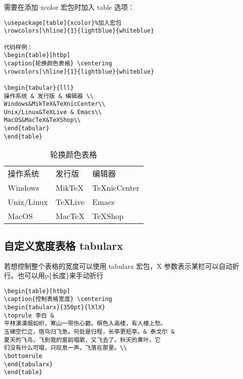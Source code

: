 需要在添加 xcolor 宏包时加入 table 选项：
\begin{Verbatim}[formatcom=\color{grass},frame=single]
\usepackage[table]{xcolor}%加入宏包
\rowcolors[\hline]{1}{lightblue}{whiteblue}

代码样例：
\begin{table}[htbp]
\caption{轮换颜色表格} \centering
\rowcolors[\hline]{1}{lightblue}{whiteblue}

\begin{tabular}{lll}
操作系统 & 发行版 & 编辑器 \\
Windows&MikTeX&TeXnicCenter\\
Unix/Linux&TeXLive & Emacs\\
MacOS&MacTeX&TeXShop\\
\end{tabular}
\end{table}
\end{Verbatim}


\begin{table}[htbp]
\caption{轮换颜色表格} \centering
{}
\begin{tabular}{lll}
操作系统 & 发行版 & 编辑器 \\
Windows&MikTeX&TeXnicCenter\\
Unix/Linux&TeXLive & Emacs\\
MacOS&MacTeX&TeXShop\\
\end{tabular}
\end{table}




\subsection{自定义宽度表格 tabularx }


若想控制整个表格的宽度可以使用 tabularx 宏包，X
参数表示某栏可以自动折行。也可以用p\{长度\}来手动折行\\
\begin{Verbatim}
\begin{table}[htbp]
\caption{控制表格宽度} \centering
\begin{tabularx}{350pt}{lXlX}
\toprule 李白 &
平林漠漠烟如织，寒山一带伤心碧。暝色入高楼，有人楼上愁。
玉梯空伫立，宿鸟归飞急。何处是归程，长亭更短亭。& 泰戈尔 &
夏天的飞鸟，飞到我的窗前唱歌，又飞去了。秋天的黄叶，它
们没有什么可唱，只叹息一声，飞落在那里。\\
\bottomrule
\end{tabularx}
\end{table}
\end{Verbatim}

